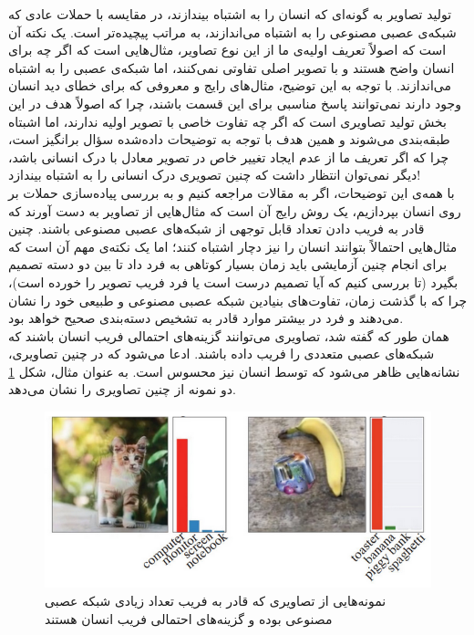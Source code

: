 \documentclass[a4paper]{article}
\begin{document}
\begin{itemize}
	تولید تصاویر  به گونه‌ای که انسان را به اشتباه بیندازند، در مقایسه با حملات  عادی که شبکه‌ی عصبی مصنوعی را به اشتباه می‌اندازند، به مراتب پیچیده‌تر است. یک نکته آن است که اصولاً تعریف اولیه‌ی ما از این نوع تصاویر، مثال‌هایی است که اگر چه برای انسان واضح هستند و با تصویر اصلی تفاوتی نمی‌کنند، اما شبکه‌ی عصبی را به اشتباه می‌اندازند. با توجه به این توضیح، مثال‌های رایج و معروفی که برای خطای دید انسان وجود دارند نمی‌توانند پاسخ مناسبی برای این قسمت باشند، چرا که اصولاً هدف در این بخش تولید تصاویری است که اگر چه تفاوت خاصی با تصویر اولیه ندارند، اما اشبتاه طبقه‌بندی می‌شوند و همین هدف با توجه به توضیحات داده‌شده سؤال برانگیز است، چرا که اگر تعریف ما از عدم ایجاد تغییر خاص در تصویر معادل با درک انسانی باشد، دیگر نمی‌توان انتظار داشت که چنین تصویری درک انسانی را به اشتباه بیندازد!\\
	
	با همه‌ی این توضیحات، اگر به مقالات مراجعه کنیم و به بررسی پیاده‌سازی حملات  بر روی انسان بپردازیم، یک روش رایج آن است که مثال‌هایی از تصاویر  به دست آورند که قادر به فریب دادن تعداد قابل توجهی از شبکه‌های عصبی مصنوعی باشند. چنین مثال‌هایی احتمالاً بتوانند انسان را نیز دچار اشتباه کنند؛ اما یک نکته‌ی مهم آن است که برای انجام چنین آزمایشی باید زمان بسیار کوتاهی به فرد داد تا بین دو دسته تصمیم بگیرد (تا بررسی کنیم که آیا تصمیم درست است یا فرد فریب تصویر  را خورده است)، چرا که با گذشت زمان، تفاوت‌های بنیادین شبکه عصبی مصنوعی و طبیعی خود را نشان می‌دهند و فرد در بیشتر موارد قادر به تشخیص دسته‌بندی صحیح خواهد بود.\\
	
همان طور که گفته شد، تصاویری می‌توانند گزینه‌های احتمالی فریب انسان باشند که شبکه‌های عصبی متعددی را فریب داده باشند. ادعا می‌شود که در چنین تصاویری، نشانه‌هایی ظاهر می‌شود که توسط انسان نیز محسوس است. به عنوان مثال، شکل \ref{fig01} دو نمونه از چنین تصاویری را نشان می‌دهد. 
\begin{figure}[h!]
	\centering
	\includegraphics[scale=0.5]{fig01.png}
	\caption{نمونه‌هایی از تصاویری که قادر به فریب تعداد زیادی شبکه عصبی مصنوعی بوده و گزینه‌های احتمالی فریب انسان هستند}
	\label{fig01}
\end{figure}


\end{itemize}
\end{document}
